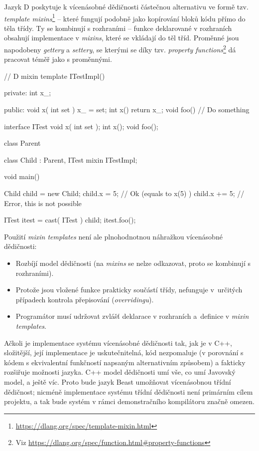 Jazyk D poskytuje k vícenásobné dědičnosti částečnou alternativu ve formě tzv. \textit{template mixins}\footnote{\url{https://dlang.org/spec/template-mixin.html}} -- které fungují podobně jako kopírování bloků kódu přímo do těla třídy. Ty se kombinují s rozhraními -- funkce deklarované v rozhraních obsahují implementace v \textit{mixins}, které se vkládají do těl tříd. Proměnné jsou napodobeny \textit{gettery} a \textit{settery}, se kterými se díky tzv. \textit{property functions}\footnote{Viz \url{https://dlang.org/spec/function.html\#property-functions}} dá pracovat téměř jako s proměnnými.

\begin{dcode}
// D
mixin template ITestImpl() {

private:
	int x_;
	
public:
	void x( int set ) {
		x_ = set;	
	}
	int x() {
		return x_;	
	}
	void foo() {
		// Do something	
	}

}

interface ITest {
	void x( int set );
	int x();
	void foo();
}

class Parent {
}

class Child : Parent, ITest {
	mixin ITestImpl;
}

void main() {
	Child child = new Child;
	child.x = 5; // Ok (equals to x(5) )
	child.x += 5; // Error, this is not possible
	
	ITest itest = cast( ITest ) child;
	itest.foo();
}
\end{dcode}

Použití \textit{mixin templates} není ale plnohodnotnou náhražkou vícenásobné dědičnosti:
\begin{itemize}
	\item Rozbíjí model dědičnosti (na \textit{mixins} se nelze odkazovat, proto se kombinují s rozhraními).
	\item Protože jsou vložené funkce prakticky součástí třídy, nefunguje v~určitých případech kontrola přepisování (\textit{overridingu}).
	\item Programátor musí udržovat zvlášť deklarace v rozhraních a~definice v \textit{mixin templates}.
\end{itemize}

Ačkoli je implementace systému vícenásobné dědičnosti tak, jak je v C++, složitější, její implementace je uskutečnitelná, kód nezpomaluje (v porovnání s kódem s ekvivalentní funkčností napsaným alternativním způsobem) a fakticky rozšiřuje možnosti jazyka. C++ model dědičnosti umí vše, co umí Javovský model, a ještě víc. Proto bude jazyk Beast umožňovat vícenásobnou třídní dědičnost; nicméně implementace systému třídní dědičnosti není primárním cílem projektu, a tak bude systém v rámci demonstračního kompilátoru značně omezen.

